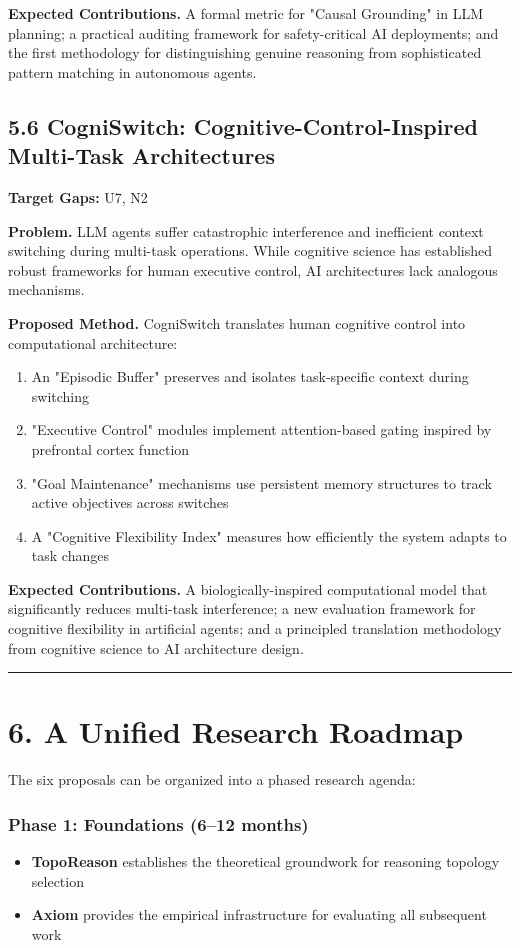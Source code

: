 \documentclass[11pt,a4paper]{article}
\begin{document}
\textbf{Expected Contributions.} A formal metric for "Causal Grounding" in LLM planning; a practical auditing framework for safety-critical AI deployments; and the first methodology for distinguishing genuine reasoning from sophisticated pattern matching in autonomous agents.

\subsection{5.6 CogniSwitch: Cognitive-Control-Inspired Multi-Task Architectures}

\textbf{Target Gaps:} U7, N2

\textbf{Problem.} LLM agents suffer catastrophic interference and inefficient context switching during multi-task operations. While cognitive science has established robust frameworks for human executive control, AI architectures lack analogous mechanisms.

\textbf{Proposed Method.} CogniSwitch translates human cognitive control into computational architecture:
\begin{enumerate}
  \item An "Episodic Buffer" preserves and isolates task-specific context during switching
  \item "Executive Control" modules implement attention-based gating inspired by prefrontal cortex function
  \item "Goal Maintenance" mechanisms use persistent memory structures to track active objectives across switches
  \item A "Cognitive Flexibility Index" measures how efficiently the system adapts to task changes
\end{enumerate}

\textbf{Expected Contributions.} A biologically-inspired computational model that significantly reduces multi-task interference; a new evaluation framework for cognitive flexibility in artificial agents; and a principled translation methodology from cognitive science to AI architecture design.

\noindent\rule{\textwidth}{0.4pt}

\section{6. A Unified Research Roadmap}

The six proposals can be organized into a phased research agenda:

\subsubsection{Phase 1: Foundations (6–12 months)}
\begin{itemize}
  \item \textbf{TopoReason} establishes the theoretical groundwork for reasoning topology selection
  \item \textbf{Axiom} provides the empirical infrastructure for evaluating all subsequent work
\end{itemize}
\end{document}
